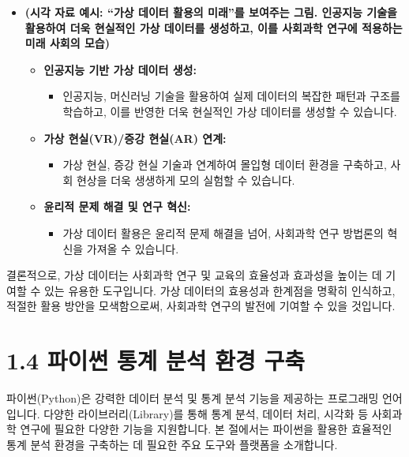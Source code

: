 \documentclass[
  letterpaper,
]{book}
\providecommand{\tightlist}{%
  \setlength{\itemsep}{0pt}\setlength{\parskip}{0pt}}
\begin{document}
\begin{itemize}
\item
  \textbf{(시각 자료 예시: ``가상 데이터 활용의 미래''를 보여주는 그림.
  인공지능 기술을 활용하여 더욱 현실적인 가상 데이터를 생성하고, 이를
  사회과학 연구에 적용하는 미래 사회의 모습)}

  \begin{itemize}
  \tightlist
  \item
    \textbf{인공지능 기반 가상 데이터 생성:}

    \begin{itemize}
    \tightlist
    \item
      인공지능, 머신러닝 기술을 활용하여 실제 데이터의 복잡한 패턴과
      구조를 학습하고, 이를 반영한 더욱 현실적인 가상 데이터를 생성할 수
      있습니다.
    \end{itemize}
  \item
    \textbf{가상 현실(VR)/증강 현실(AR) 연계:}

    \begin{itemize}
    \tightlist
    \item
      가상 현실, 증강 현실 기술과 연계하여 몰입형 데이터 환경을
      구축하고, 사회 현상을 더욱 생생하게 모의 실험할 수 있습니다.
    \end{itemize}
  \item
    \textbf{윤리적 문제 해결 및 연구 혁신:}

    \begin{itemize}
    \tightlist
    \item
      가상 데이터 활용은 윤리적 문제 해결을 넘어, 사회과학 연구 방법론의
      혁신을 가져올 수 있습니다.
    \end{itemize}
  \end{itemize}
\end{itemize}

결론적으로, 가상 데이터는 사회과학 연구 및 교육의 효율성과 효과성을
높이는 데 기여할 수 있는 유용한 도구입니다. 가상 데이터의 효용성과
한계점을 명확히 인식하고, 적절한 활용 방안을 모색함으로써, 사회과학
연구의 발전에 기여할 수 있을 것입니다.

\section{1.4 파이썬 통계 분석 환경
구축}\label{uxd30cuxc774uxc36c-uxd1b5uxacc4-uxbd84uxc11d-uxd658uxacbd-uxad6cuxcd95}

파이썬(Python)은 강력한 데이터 분석 및 통계 분석 기능을 제공하는
프로그래밍 언어입니다. 다양한 라이브러리(Library)를 통해 통계 분석,
데이터 처리, 시각화 등 사회과학 연구에 필요한 다양한 기능을 지원합니다.
본 절에서는 파이썬을 활용한 효율적인 통계 분석 환경을 구축하는 데 필요한
주요 도구와 플랫폼을 소개합니다.
\end{document}
